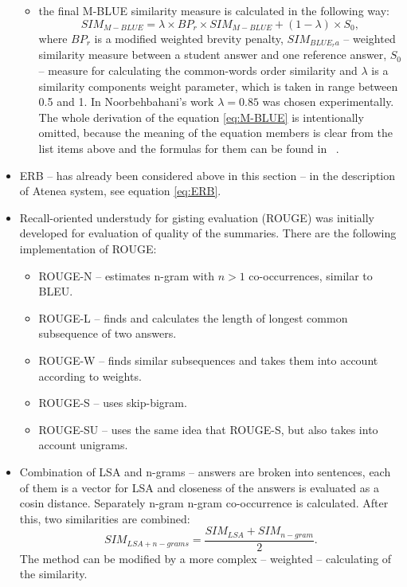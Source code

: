 \begin{itemize}
\begin{itemize}
\item the final M-BLUE similarity measure is calculated in the following way:
\begin{equation} \label{eq:M-BLUE}
SIM_{M-BLUE} = \lambda \times BP_r \times SIM_{M-BLUE} + (1 - \lambda) \times S_0,
\end{equation}
where $BP_r$ is a modified weighted brevity penalty, $SIM_{BLUE_ra}$ -- weighted similarity measure between a student answer and one reference answer, $S_0$ --  measure for calculating the common-words order similarity and $\lambda$ is a similarity components weight parameter, which is taken in range between 0.5 and 1. In Noorbehbahani's work $\lambda = 0.85$ was chosen experimentally. The whole derivation of the equation \ref{eq:M-BLUE} is intentionally omitted, because the meaning of the equation members is clear from the list items above and the formulas for them can be found in ~\cite{Noorbehbahani}.
\end{itemize}
\item ERB -- has already been considered above in this section -- in the description of Atenea system, see equation \ref{eq:ERB}.
\item Recall-oriented understudy for gisting evaluation (ROUGE) was initially developed for evaluation of quality of the summaries. There are the following implementation of ROUGE:
\begin{itemize}
\item ROUGE-N -- estimates n-gram with $n>1$ co-occurrences, similar to BLEU.
\item ROUGE-L -- finds and calculates the length of longest common subsequence of two answers.
\item ROUGE-W -- finds similar subsequences and takes them into account according to weights.
\item ROUGE-S -- uses skip-bigram.
\item ROUGE-SU -- uses the same idea that ROUGE-S, but also takes into account unigrams.
\end{itemize}
\item Combination of LSA and n-grams -- answers are broken into sentences, each of them is a vector for LSA and closeness of the answers is evaluated as a cosin distance. Separately n-gram n-gram co-occurrence is calculated. After this, two similarities are combined:\\
\begin{equation} \label{eq:LSA+n-grams}
SIM_{LSA+n-grams} = \frac{SIM_{LSA} + SIM_{n-gram}}{2}.
\end{equation}
The method can be modified by a more complex -- weighted -- calculating of the similarity.
\end{itemize}

